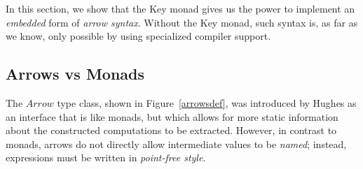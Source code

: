 \documentclass{sigplanconf}
\newcommand{\Conid}[1]{\mathit{#1}}
\begin{document}
In this section, we show that the Key monad gives us the power to implement an \emph{embedded} form of \emph{arrow syntax}. Without the Key monad, such syntax is, as far as we know, only possible by using specialized compiler support.

\subsection{Arrows vs Monads}

The \ensuremath{\Conid{Arrow}} type class, shown in Figure\ \ref{arrowsdef}, was introduced by Hughes \cite{arrows} as an interface that is like monads, but which allows for more static information about the constructed computations to be extracted. However, in contrast to monads, arrows do not directly allow intermediate values to be \emph{named}; instead, expressions must be written in \emph{point-free style}. 
\end{document}
